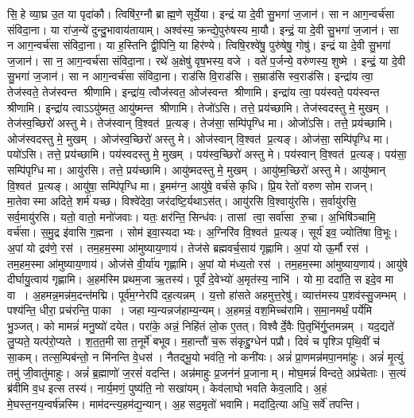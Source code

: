 सि॒हे व्या॒घ्र उ॒त या पृदा॑कौ। त्विषि॑र॒ग्नौ ब्राह्म॒णे सूर्ये॒या।
इन्द्रं या दे॒वी सु॒भगा॑ ज॒जान॑। सा न आग॒न्वर्च॑सा संविदा॒ना।
या रा॑ज॒न्ये॑ दुन्दु॒भावाय॑तायाम्। अश्व॑स्य॒ क्रन्द्ये॒पुरु॑षस्य मा॒यौ।
इन्द्रं॒ या दे॒वी सु॒भगा॑ ज॒जान॑। सा न आग॒न्वर्च॑सा संविदा॒ना।
या ह॒स्तिनि द्वी॒पिनि॒ या हिर॑ण्ये। त्विषि॒रश्वे॑षु॒ पुरु॑षेषु॒ गोषु॑।
इन्द्रं या दे॒वी सु॒भगा॑ ज॒जान॑। सा न॒ आग॒न्वर्च॑सा संविदा॒ना।
रथे॑ अ॒क्षेषु॑ वृष॒भस्य॒ वजे। वते॑ प॒र्जन्ये॒ वरु॑णस्य॒ शुष्मे।
इन्द्रं॒ या दे॒वी सु॒भगा॑ ज॒जान॑। सा न आग॒न्वर्च॑सा संविदा॒ना।
राड॑सि वि॒राड॑सि। स॒म्राड॑सि स्व॒राड॑सि।
इन्द्रा॑य त्वा॒ तेज॑स्वते॒ तेज॑स्वन्त श्रीणामि।
इन्द्रा॑य॒ त्वौज॑स्वत॒ ओज॑स्वन्त श्रीणामि।
इन्द्रा॑य त्वा॒ पय॑स्वते॒ पय॑स्वन्त श्रीणामि।
इन्द्रा॑य त्वाऽऽयु॑ष्मत॒ आयु॑ष्मन्त श्रीणामि।
तेजो॑ऽसि। तत्ते॒ प्रय॑च्छामि। तेज॑स्वदस्तु मे॒ मुखम्।
तेज॑स्व॒च्छिरो॑ अस्तु मे। तेज॑स्वान् वि॒श्वत॑ प्र॒त्यङ्।
तेज॑सा॒ सम्पि॑पृग्धि मा।
ओजो॑ऽसि। तत्ते॒ प्रय॑च्छामि। ओज॑स्वदस्तु मे॒ मुखम्।
ओज॑स्व॒च्छिरो॑ अस्तु मे। ओज॑स्वान् वि॒श्वत॑ प्र॒त्यङ्।
ओज॑सा॒ सम्पि॑पृग्धि मा।
पयो॑ऽसि। तत्ते॒ प्रय॑च्छामि। पय॑स्वदस्तु मे॒ मुखम्।
पय॑स्व॒च्छिरो॑ अस्तु मे। पय॑स्वान् वि॒श्वत॑ प्र॒त्यङ्।
पय॑सा॒ सम्पि॑पृग्धि मा।
आयु॑रसि। तत्ते॒ प्रय॑च्छामि। आयु॑ष्मदस्तु मे॒ मुखम्।
आयु॑ष्म॒च्छिरो॑ अस्तु मे। आयु॑ष्मान् वि॒श्वत॑ प्र॒त्यङ्।
आयु॑षा॒ सम्पि॑पृग्धि मा।
इ॒मम॑ग्न॒ आयु॑षे॒ वर्च॑से कृधि। प्रि॒यरेतो॑ वरुण सोम राजन्।
मा॒तेवास्मा अदिते॒ शर्म॑ यच्छ। विश्वे॑देवा॒ जर॑दष्टि॒र्यथाऽस॑त्।
आयु॑रसि वि॒श्वायु॑रसि। स॒र्वायु॑रसि॒ सर्व॒मायु॑रसि।
यतो॒ वातो॒ मनो॑जवाः। यतः॒ क्षर॑न्ति॒ सिन्ध॑वः।
तासां त्वा॒ सर्वा॑सा रु॒चा। अ॒भिषि॑ञ्चामि॒ वर्च॑सा।
स॒मु॒द्र इ॑वासि ग॒ह्मना। सोम॑ इवा॒स्यदाभ्यः।
अ॒ग्निरि॑व वि॒श्वत॑ प्र॒त्यङ्। सूर्य॑ इव॒ ज्योति॑षा वि॒भूः।
अ॒पां यो द्रव॑णे॒ रस॑। तम॒हम॒स्मा आ॑मुष्याय॒णाय॑।
तेज॑से ब्रह्मवर्च॒साय॑ गृह्णामि।
अ॒पां यो ऊ॒र्मौ रस॑। तम॒हम॒स्मा आ॑मुष्याय॒णाय॑।
ओज॑से वी॒र्या॑य गृह्णामि।
अ॒पां यो म॑ध्य॒तो रस॑। तम॒हम॒स्मा आ॑मुष्याय॒णाय॑।
आयु॑षे दीर्घायु॒त्वाय॑ गृह्णामि।
अ॒हम॑स्मि प्रथम॒जा ऋ॒तस्य॑। पूर्वं॑ दे॒वेभ्यो॑ अ॒मृत॑स्य॒ नाभि॑।
यो मा॒ ददा॑ति॒ स इदे॒व मा वा। अ॒हमन्न॒मन्न॑म॒दन्त॑मद्मि।
पूर्व॑म॒ग्नेरपि॑ दह॒त्यन्नम्। य॒त्तो हा॑सते अहमुत्त॒रेषु॑।
व्यात्त॑मस्य प॒शव॑स्सु॒जम्भम्। पश्य॑न्ति॒ धीरा॒ प्रच॑रन्ति॒ पाका।
जहाम्य॒न्यन्नज॑हाम्य॒न्यम्। अ॒हमन्नं॒ वश॒मिच्च॑रामि।
स॒मा॒नमर्थं॒ पर्ये॑मि भु॒ञ्जत्। को मामन्नं॑ मनु॒ष्यो॑ दयेत।
परा॑के॒ अन्नं॒ निहि॑तं लो॒क ए॒तत्। विश्वैर्दे॒वैः पि॒तृभि॑र्गु॒प्तमन्नम्।
यद॒द्यते॑ लु॒प्यते॒ यत्प॑रो॒प्यते। श॒त॒त॒मी सा त॒नूर्मे॑ बभूव।
म॒हान्तौ॑ च॒रू स॑कृद्दु॒ग्धेन॑ पप्रौ। दिवं॑ च पृश्ञि पृथि॒वीं च॑ सा॒कम्।
तत्स॒म्पिब॑न्तो॒ न मि॑नन्ति वे॒धस॑। नैतद्भू॒यो भव॑ति॒ नो कनी॑यः।
अन्नं॑ प्रा॒णमन्न॑मपा॒नमा॑हुः। अन्नं॑ मृ॒त्युं तमु॑ जी॒वातु॑माहुः।
अन्नं॑ ब्र॒ह्माणो॑ ज॒रसं॑ वदन्ति। अन्न॑माहुः प्र॒जन॑नं प्र॒जानाम्।
मोघ॒मन्नं॑ विन्दते॒ अप्र॑चेताः। स॒त्यं ब्र॑वीमि व॒ध इत्स तस्य॑।
नार्य॒मणं॒ पुष्य॑ति॒ नो सखा॑यम्। केव॑लाघो भवति केव॒लादि।
अ॒हं मे॒घस्त॒नय॒न्वर्ष॑न्नस्मि। माम॑दन्त्य॒हम॑द्य॒न्यान्।
अ॒हसद॒मृतो॑ भवामि। मदा॑दि॒त्या अधि॒ सर्वे॑ तपन्ति।

